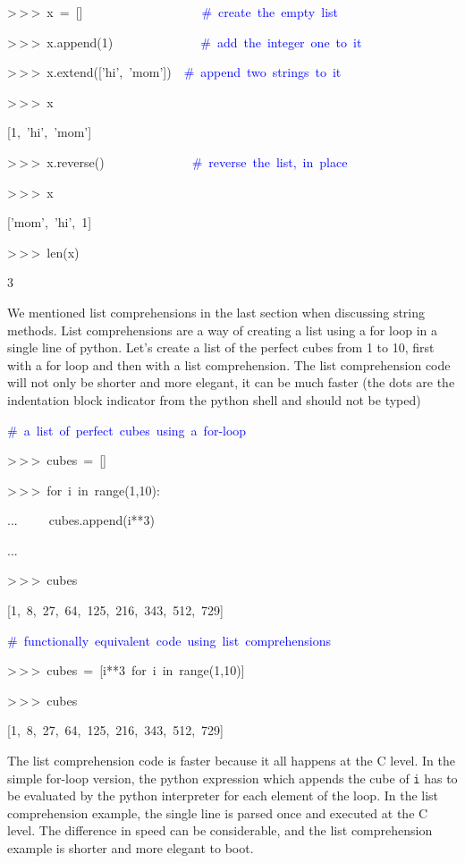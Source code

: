 \begin{lyxcode}
>\,{}>\,{}>~x~=~{[}]~~~~~~~~~~~~~~~~~~~\textcolor{blue}{\#~create~the~empty~list}

>\,{}>\,{}>~x.append(1)~~~~~~~~~~~~~~\textcolor{blue}{\#~add~the~integer~one~to~it}

>\,{}>\,{}>~x.extend({[}'hi',~'mom'])~~\textcolor{blue}{\#~append~two~strings~to~it}

>\,{}>\,{}>~x

{[}1,~'hi',~'mom']

>\,{}>\,{}>~x.reverse()~~~~~~~~~~~~~~\textcolor{blue}{\#~reverse~the~list,~in~place}

>\,{}>\,{}>~x

{[}'mom',~'hi',~1]

>\,{}>\,{}>~len(x)

3
\end{lyxcode}
We mentioned list comprehensions in the last section when discussing
string methods.  List comprehensions are a way of creating a list
using a for loop in a single line of python. Let's create a list of
the perfect cubes from 1 to 10, first with a for loop and then with
a list comprehension. The list comprehension code will not only be
shorter and more elegant, it can be much faster (the dots are the
indentation block indicator from the python shell and should not be
typed)

\begin{lyxcode}
\textcolor{blue}{\#~a~list~of~perfect~cubes~using~a~for-loop}

>\,{}>\,{}>~cubes~=~{[}]

>\,{}>\,{}>~for~i~in~range(1,10):

...~~~~~cubes.append(i{*}{*}3)

...~

>\,{}>\,{}>~cubes

{[}1,~8,~27,~64,~125,~216,~343,~512,~729]



\textcolor{blue}{\#~functionally~equivalent~code~using~list~comprehensions}

>\,{}>\,{}>~cubes~=~{[}i{*}{*}3~for~i~in~range(1,10)]

>\,{}>\,{}>~cubes

{[}1,~8,~27,~64,~125,~216,~343,~512,~729]
\end{lyxcode}
The list comprehension code is faster because it all happens at the
C level.  In the simple for-loop version, the python expression which
appends the cube of \texttt{i} has to be evaluated by the python interpreter
for each element of the loop. In the list comprehension example, the
single line is parsed once and executed at the C level.  The difference
in speed can be considerable, and the list comprehension example is
shorter and more elegant to boot.

